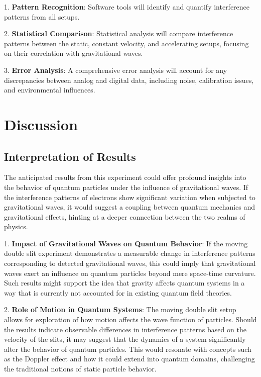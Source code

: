 \documentclass{article}
\begin{document}
1. \textbf{Pattern Recognition}: Software tools will identify and quantify interference patterns from all setups.
   
2. \textbf{Statistical Comparison}: Statistical analysis will compare interference patterns between the static, constant velocity, and accelerating setups, focusing on their correlation with gravitational waves.
   
3. \textbf{Error Analysis}: A comprehensive error analysis will account for any discrepancies between analog and digital data, including noise, calibration issues, and environmental influences.

\section{Discussion}

\subsection{Interpretation of Results}
The anticipated results from this experiment could offer profound insights into the behavior of quantum particles under the influence of gravitational waves. If the interference patterns of electrons show significant variation when subjected to gravitational waves, it would suggest a coupling between quantum mechanics and gravitational effects, hinting at a deeper connection between the two realms of physics.

1. \textbf{Impact of Gravitational Waves on Quantum Behavior}: If the moving double slit experiment demonstrates a measurable change in interference patterns corresponding to detected gravitational waves, this could imply that gravitational waves exert an influence on quantum particles beyond mere space-time curvature. Such results might support the idea that gravity affects quantum systems in a way that is currently not accounted for in existing quantum field theories.

2. \textbf{Role of Motion in Quantum Systems}: The moving double slit setup allows for exploration of how motion affects the wave function of particles. Should the results indicate observable differences in interference patterns based on the velocity of the slits, it may suggest that the dynamics of a system significantly alter the behavior of quantum particles. This would resonate with concepts such as the Doppler effect and how it could extend into quantum domains, challenging the traditional notions of static particle behavior.
\end{document}
